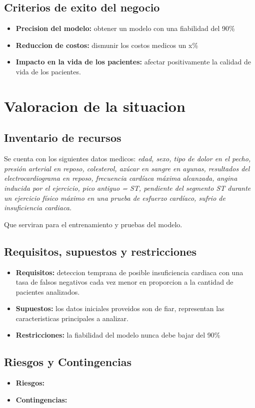 \documentclass[12pt, letterpaper, spanish]{article}
\begin{document}
\subsection{Criterios de exito del negocio}
  \begin{itemize}
    \item{\textbf{Precision del modelo: }obtener un modelo con una fiabilidad del 90\%} 
    \item{\textbf{Reduccion de costos: }dismunir los costos medicos un x\%}
    \item{\textbf{Impacto en la vida de los pacientes: }afectar positivamente la calidad de vida
    de los pacientes.}
  \end{itemize}
\section{Valoracion de la situacion}
\subsection{Inventario de recursos}
Se cuenta con los siguientes datos medicos: \emph{edad, sexo, tipo de dolor en el pecho, 
presión arterial en reposo, colesterol, azúcar en sangre en ayunas, 
resultados del electrocardiograma en reposo, frecuencia cardíaca máxima alcanzada, 
angina inducida por el ejercicio, pico antiguo = ST, 
pendiente del segmento ST durante un ejercicio físico máximo en una prueba de esfuerzo cardíaco, 
sufrio de insuficiencia cardiaca.}

Que serviran para el entrenamiento y pruebas del modelo.
\subsection{Requisitos, supuestos y restricciones}
\begin{itemize}
  \item{\textbf{Requisitos: }deteccion temprana de posible insuficiencia cardiaca
  con una tasa de falsos negativos cada vez menor en proporcion a la
  cantidad de pacientes analizados.} 
  \item{\textbf{Supuestos: }los datos iniciales proveidos son de fiar, representan
  las caracteristicas principales a analizar.}
  \item{\textbf{Restricciones: }la fiabilidad del modelo nunca debe bajar del 90\%}
\end{itemize}
\subsection{Riesgos y Contingencias}
\begin{itemize}
  \item{\textbf{Riesgos: }} 
  \item{\textbf{Contingencias: }}
\end{itemize}
\end{document}

